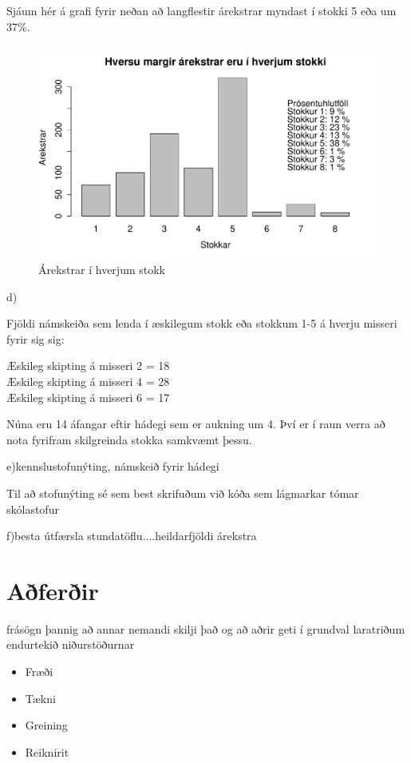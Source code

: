 \documentclass[a4paper,12pt]{article}
\begin{document}
Sjáum hér á grafi fyrir neðan að langflestir árekstrar myndast í stokki 5 eða um 37$\%$. 


\begin{figure}[ht!]
\centering
\includegraphics[width=120mm]{c_lidur_plot}
\caption{Árekstrar í hverjum stokk}
\label{fig: arekstrar}
\end{figure}



d)

Fjöldi námskeiða sem lenda í æskilegum stokk eða stokkum 1-5 á hverju misseri fyrir sig sig:

Æskileg skipting á misseri 2 = 18\\
Æskileg skipting á misseri 4 = 28\\
Æskileg skipting á misseri 6 = 17

Núna eru 14 áfangar eftir hádegi sem er aukning um 4. Því er í raun verra að nota fyrifram skilgreinda stokka samkvæmt þessu.

e)kennslustofunýting, námskeið fyrir hádegi


Til að stofunýting sé sem best skrifuðum við kóða sem lágmarkar tómar skólastofur

f)besta útfærsla stundatöflu....heildarfjöldi árekstra

\section{Aðferðir}
frásögn þannig að annar nemandi skilji það og að aðrir geti í
grundval laratriðum endurtekið niðurstöðurnar
\begin{itemize}
\item Fræði
\item Tækni
\item Greining
\item Reiknirit
\end{itemize}
\end{document}
